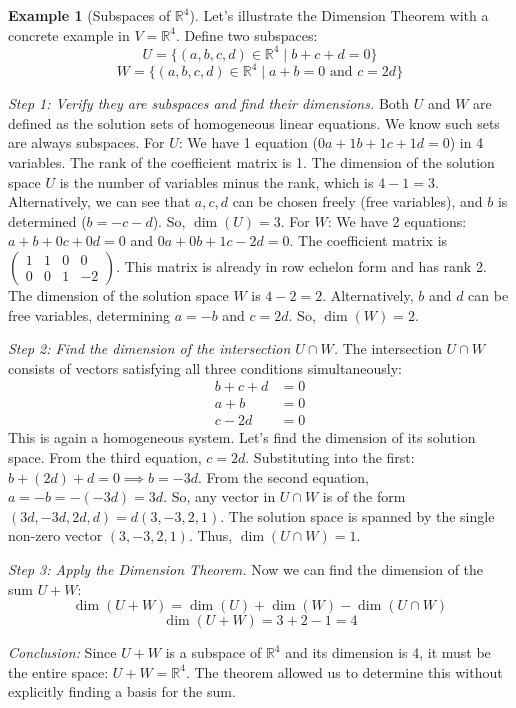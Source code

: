 \documentclass[11pt]{article}
\theoremstyle{definition}
\newtheorem{example}[theorem]{Example}
\theoremstyle{remark}
\newcommand{\R}{\mathbb{R}}
\newcommand{\dimn}{\operatorname{dim}}
\newcommand{\intersect}{\cap}
\begin{document}
\begin{example}[Subspaces of $\R^4$] \label{ex:R4_dim_thm}
Let's illustrate the Dimension Theorem with a concrete example in $V = \R^4$. Define two subspaces:
\[ U = \{ (a, b, c, d) \in \R^4 \mid b+c+d = 0 \} \]
\[ W = \{ (a, b, c, d) \in \R^4 \mid a+b = 0 \text{ and } c = 2d \} \]

\textit{Step 1: Verify they are subspaces and find their dimensions.}
Both $U$ and $W$ are defined as the solution sets of homogeneous linear equations. We know such sets are always subspaces.
For $U$: We have 1 equation ($0a+1b+1c+1d=0$) in 4 variables. The rank of the coefficient matrix is 1. The dimension of the solution space $U$ is the number of variables minus the rank, which is $4-1=3$. Alternatively, we can see that $a, c, d$ can be chosen freely (free variables), and $b$ is determined ($b=-c-d$). So, $\dimn(U) = 3$.
For $W$: We have 2 equations: $a+b+0c+0d=0$ and $0a+0b+1c-2d=0$. The coefficient matrix is $\begin{pmatrix} 1 & 1 & 0 & 0 \\ 0 & 0 & 1 & -2 \end{pmatrix}$. This matrix is already in row echelon form and has rank 2. The dimension of the solution space $W$ is $4-2=2$. Alternatively, $b$ and $d$ can be free variables, determining $a=-b$ and $c=2d$. So, $\dimn(W) = 2$.

\textit{Step 2: Find the dimension of the intersection $U \intersect W$.}
The intersection $U \intersect W$ consists of vectors satisfying all three conditions simultaneously:
\begin{align*} b+c+d &= 0 \\ a+b &= 0 \\ c - 2d &= 0 \end{align*}
This is again a homogeneous system. Let's find the dimension of its solution space. From the third equation, $c=2d$. Substituting into the first: $b+(2d)+d = 0 \implies b = -3d$. From the second equation, $a = -b = -(-3d) = 3d$.
So, any vector in $U \intersect W$ is of the form $(3d, -3d, 2d, d) = d(3, -3, 2, 1)$. The solution space is spanned by the single non-zero vector $(3, -3, 2, 1)$. Thus, $\dimn(U \intersect W) = 1$.

\textit{Step 3: Apply the Dimension Theorem.}
Now we can find the dimension of the sum $U+W$:
\[ \dimn(U+W) = \dimn(U) + \dimn(W) - \dimn(U \intersect W) \]
\[ \dimn(U+W) = 3 + 2 - 1 = 4 \]

\textit{Conclusion:} Since $U+W$ is a subspace of $\R^4$ and its dimension is 4, it must be the entire space: $U+W = \R^4$. The theorem allowed us to determine this without explicitly finding a basis for the sum.
\end{example}
\end{document}
